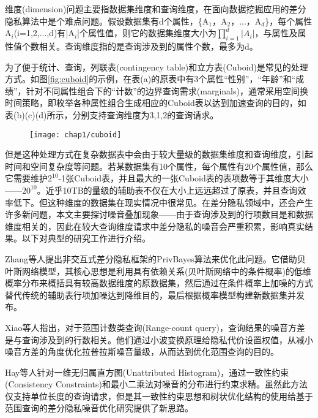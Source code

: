 维度(dimension)问题主要指数据集维度和查询维度，在面向数据挖掘应用的差分隐私算法中是个难点问题。假设数据集有d个属性，\{A$_{1}$，A$_{2}$，...，A$_{d}$\}，每个属性A$_{i}$(i=1,2,...,d)有|A$_{i}$|个属性值，则它的数据集维度大小为\(\prod\limits_{i = 1}^d {|A{_i} |}\)，与属性及属性值个数相关。查询维度指的是查询涉及到的属性个数，最多为d。

为了便于统计、查询，列联表(contingency table)和立方表(Cuboid)是常见的处理方式。如图\ref{fig:cuboid}的示例，在表(a)的原表中有3个属性“性别”，“年龄”和“成绩”，针对不同属性组合下的“计数”的边界查询需求(marginals\cite{marginals})，通常采用空间换时间策略，即枚举各种属性组合生成相应的Cuboid表以达到加速查询的目的，如表(b)(c)(d)所示，分别支持查询维度为3,1,2的查询请求。

\begin{figure}[!htp]
	\centering
	\texttt{[image: chap1/cuboid]}
\end{figure}

但是这种处理方式在复杂数据表中会由于较大量级的数据集维度和查询维度，引起时间和空间复杂度等问题。若某数据集有10个属性，每个属性有20个属性值，那么它需要维护$2^{10}$-1张Cuboid表，并且最大的一张Cuboid表的表项数等于其维度大小——$20^{10}$。近乎10TB的量级的辅助表不仅在大小上远远超过了原表，并且查询效率低下。但这种维度的数据集在现实情况中很常见。在差分隐私领域中，还会产生许多新问题，本文主要探讨噪音叠加现象——由于查询涉及到的行项数目是和数据维度相关的，因此在较大查询维度请求中差分隐私的噪音会严重积累，影响真实结果。以下对典型的研究工作进行介绍。

Zhang\cite{privbayes}等人提出非交互式差分隐私框架的PrivBayes算法来优化此问题。它借助贝叶斯网络模型，其核心思想是利用具有依赖关系(贝叶斯网络中的条件概率)的低维概率分布来概括具有较高数据维度的原数据集，然后通过在条件概率上加噪的方式替代传统的辅助表行项加噪达到降维目的，最后根据概率模型构建新数据集并发布。

Xiao\cite{wavelet}等人指出，对于范围计数类查询(Range-count query)，查询结果的噪音方差是与查询涉及到的行数相关。他们通过小波变换原理给隐私代价设置权值，从减小噪音方差的角度优化拉普拉斯噪音量级，从而达到优化范围查询的目的。

Hay\cite{boosting}等人针对一维无归属直方图(Unattributed Histogram)，通过一致性约束(Consistency Constraints)和最小二乘法对噪音的分布进行约束求精。虽然此方法仅支持单位长度的查询请求，但是其一致性约束思想和树状优化结构的使用给基于范围查询的差分隐私噪音优化研究提供了新思路。

